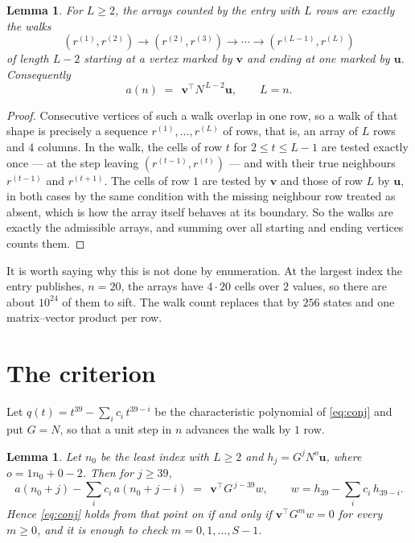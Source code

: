 \documentclass[11pt,a4paper]{article}
\theoremstyle{plain}
\newtheorem{lemma}[theorem]{Lemma}
\theoremstyle{definition}
\begin{document}
\begin{lemma}\label{lem:walk}
For $L\ge2$, the arrays counted by the entry with $L$ rows are exactly the walks
\[
(r^{(1)},r^{(2)})\to(r^{(2)},r^{(3)})\to\cdots\to(r^{(L-1)},r^{(L)})
\]
of length $L-2$ starting at a vertex marked by $\mathbf{v}$ and ending at one marked by
$\mathbf{u}$. Consequently
\[
a(n)\;=\;\,\mathbf{v}^{\!\top}N^{\,L-2}\mathbf{u},\qquad L=n .
\]
\end{lemma}

\begin{proof}
Consecutive vertices of such a walk overlap in one row, so a walk of that shape is
precisely a sequence $r^{(1)},\dots,r^{(L)}$ of rows, that is, an array of $L$ rows
and $4$ columns. In the walk, the cells of row $t$ for $2\le t\le L-1$ are tested
exactly once --- at the step leaving $(r^{(t-1)},r^{(t)})$ --- and with their true
neighbours $r^{(t-1)}$ and $r^{(t+1)}$. The cells of row $1$ are tested by
$\mathbf{v}$ and those of row $L$ by $\mathbf{u}$, in both cases by the same condition
with the missing neighbour row treated as absent, which is how the array itself behaves at
its boundary. So the walks are exactly the admissible arrays, and summing over all starting
and ending vertices counts them.
\end{proof}


It is worth saying why this is not done by enumeration. At the largest index the entry
publishes, $n=20$, the arrays have $4\cdot20$ cells over
$2$ values, so there are about $10^{24}$ of them to sift. The
walk count replaces that by $256$ states and one matrix--vector product per row.
\section{The criterion}

Let $q(t)=t^{39}-\sum_i c_i\,t^{39-i}$ be the characteristic polynomial of
\eqref{eq:conj} and put $G=N$, so that a unit step in $n$ advances the walk by
$1$ row.

\begin{lemma}\label{lem:crit}
Let $n_0$ be the least index with $L\ge2$ and $h_j=G^{j}N^{o}\mathbf{u}$, where
$o=1n_0+0-2$. Then for $j\ge39$,
\[
a(n_0+j)-\sum_i c_i\,a(n_0+j-i)\;=\;\,\mathbf{v}^{\!\top}G^{\,j-39}w,
\qquad w=h_{39}-\sum_i c_i\,h_{39-i} .
\]
Hence \eqref{eq:conj} holds from that point on if and only if
$\mathbf{v}^{\!\top}G^{m}w=0$ for every $m\ge0$, and it is enough to check
$m=0,1,\dots,S-1$.
\end{lemma}
\end{document}
